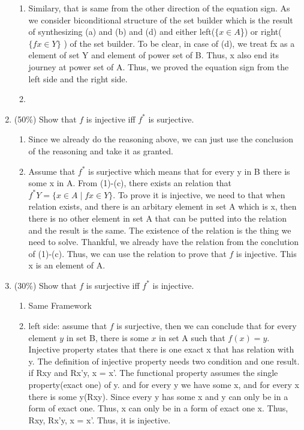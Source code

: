 \documentclass[10pt]{article}
\begin{document}
\begin{enumerate}
\begin{enumerate}
    \item Similary, that is same from the other direction of the equation sign. As we consider biconditional structure of the set builder which is the result of synthesizing (a) and (b) and (d) and either left($\{x \in A$\}) or right($\{f x \in Y\}$ ) of the set builder. To be clear, in case of (d), we treat fx as a element of set Y and element of power set of B. Thus, x also end its journey at power set of A. Thus, we proved the equation sign from the left side and the right side.
    \item 
  \end{enumerate}
  \item (50\%) Show that $f$ is injective iff $f^{*}$ is surjective.
  \begin{enumerate}
    \item Since we already do the reasoning above, we can just use the conclusion of the reasoning and take it as granted. 
    \item Assume that $f^{*}$ is surjective which means that for every y in B there is some x in A. From (1)-(c), there exists an relation that $f^{*} Y=\{x \in A \mid f x \in Y\}$. To prove it is injective, we need to that when relation exists, and there is an arbitary element in set A which is x, then there is no other element in set A that can be putted into the relation and the result is the same. The existence of the relation is the thing we need to solve. Thankful, we already have the relation from the conclution of (1)-(c). Thus, we can use the relation to prove that $f$ is injective. This x is an element of A. 
  \end{enumerate}
  \item (30\%) Show that $f$ is surjective iff $f^{*}$ is injective. 
  \begin{enumerate}
    \item Same Framework
    \item left side: assume that $f$ is surjective, then we can conclude that for every element $y$ in set B, there is some $x$ in set A such that $f(x)=y$. Injective property states that there is one exact x that has relation with y. The definition of injective property needs two condition and one result. if Rxy and Rx'y, x = x'. The functional property assumes the single property(exact one) of y. and for every y we have some x, and for every x there is some y(Rxy). Since every y has some x and y can only be in a form of exact one. Thus, x can only be in a form of exact one x. Thus, Rxy, Rx'y, x = x'. Thus, it is injective. 

\end{enumerate}
\end{enumerate}
\end{document}
